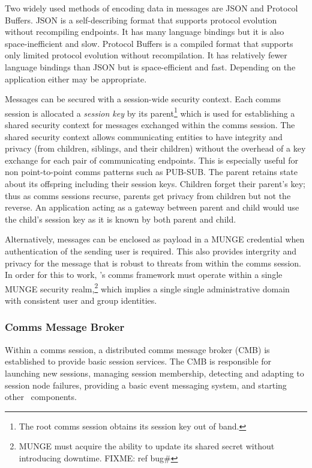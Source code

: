 Two widely used methods of encoding data in messages are
JSON\cite{rfc4627} 
and Protocol Buffers\cite{Protobuf}.
JSON is a self-describing format
that supports protocol evolution without recompiling endpoints.  It has
many language bindings but it is also space-inefficient and slow.
Protocol Buffers is a compiled format that supports
only limited protocol evolution without recompilation.  It has relatively
fewer language bindings than JSON but is space-efficient and fast.
Depending on the application either may be appropriate.

Messages can be secured with a session-wide security context.
Each comms session is allocated a {\em session key} by its parent\footnote{
The root comms session obtains its session key out of band.}
which is used for establishing a shared security context
for messages exchanged within the comms session.
The shared security context allows communicating entities to have integrity
and privacy (from children, siblings, and their children)
without the overhead
of a key exchange for each pair of communicating endpoints.
This is especially useful for non point-to-point comms patterns such as PUB-SUB.
The parent retains state about its offspring including their session keys.
Children forget their parent's key;  thus as comms sessions recurse,
parents get privacy from children but not the reverse.
An application acting as a gateway between parent and child would use
the child's session key as it is known by both parent and child.

Alternatively, messages can be enclosed as payload in a MUNGE\cite{MUNGE}
credential when authentication of the sending user is required.
This also provides intergrity and privacy for the message that
is robust to threats from within the comms session.
In order for this to work, \ngrm's comms framework must operate within a
single MUNGE security realm,\footnote{MUNGE must acquire the ability
to update its shared secret without introducing downtime. FIXME: ref bug\#}
which implies a single single administrative domain with consistent
user and group identities.

\subsubsection{Comms Message Broker}\label{SecCommsCMB}

Within a comms session, a distributed comms message broker (CMB)
is established to provide basic session services.
The CMB is responsible for launching new sessions,
managing session membership,
detecting and adapting to session node failures,
providing a basic event messaging system,
and starting other \ngrm\ components.

